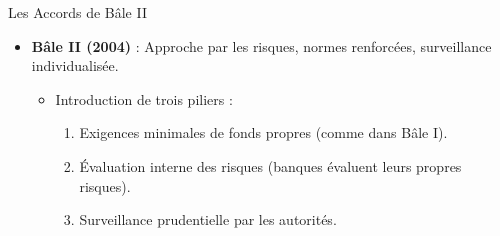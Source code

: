 \begin{frame}{Les Accords de Bâle II}
    \begin{itemize}
        \item \textbf{Bâle II (2004)} : Approche par les risques, normes renforcées, surveillance individualisée.
            \begin{itemize}
                \item Introduction de trois piliers :
                    \begin{enumerate}
                        \item Exigences minimales de fonds propres (comme dans Bâle I).
                        \item Évaluation interne des risques (banques évaluent leurs propres risques).
                        \item Surveillance prudentielle par les autorités.
                    \end{enumerate}
            \end{itemize}
    \end{itemize}
\end{frame}
